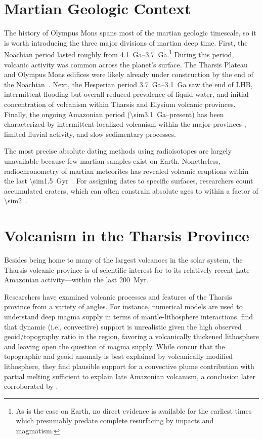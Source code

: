 \section{Martian Geologic Context}

The history of Olympus Mons spans most of the martian geologic timescale, so it is worth introducing the three major divisions of martian deep time\parencite{carr_geologic_2010}. First, the Noachian period lasted roughly from \qtyrange{4.1}{3.7}{Ga}.\footnote{As is the case on Earth, no direct evidence is available for the earliest times which presumably predate complete resurfacing by impacts and magmatism.} During this period, volcanic activity was common across the planet's surface. The Tharsis Plateau and Olympus Mons edifices were likely already under construction by the end of the Noachian~\parencite[cf.][]{isherwood_volcanic_2013,broquet_gravitational_2019}. Next, the Hesperian period \qtyrange{3.7}{3.1}{Ga} saw the end of \ac{LHB}, intermittent flooding but overall reduced prevalence of liquid water, and initial concentration of volcanism within Tharsis and Elysium volcanic provinces. Finally, the ongoing Amazonian period (\qty{\sim3.1}{Ga}--present) has been characterized by intermittent localized volcanism within the major provinces \parencite[e.g.,][]{grott_long-term_2013}, limited fluvial activity, and slow sedimentary processes.

The most precise absolute dating methods using radioisotopes are largely unavailable because few martian samples exist on Earth. Nonetheless, radiochronometry of martian meteorites has revealed volcanic eruptions within the last \qty{\sim1.5}{Gyr}~\parencite[e.g.,][]{cohen_taking_2017}. For assigning dates to specific surfaces, researchers count accumulated craters, which can often constrain absolute ages to within a factor of \num{\sim2}~\parencite[e.g.,][]{kneissl_map-projection-independent_2011}.

\section{Volcanism in the Tharsis Province}

Besides being home to many of the largest volcanoes in the solar system, the Tharsis volcanic province is of scientific interest for to its relatively recent Late Amazonian activity---within the last \qty{200}{Myr}.

Researchers have examined volcanic processes and features of the Tharsis province from a variety of angles. For instance, numerical models are used to understand deep magma supply in terms of mantle-lithosphere interactions. \textcite{roberts_plume-induced_2004} find that dynamic (i.e., convective) support is unrealistic given the high observed geoid/topography ratio in the region, favoring a volcanically thickened lithosphere and leaving open the question of magma supply. While \textcite{redmond_numerical_2004} concur that the topographic and geoid anomaly is best explained by volcanically modified lithosphere, they find plausible support for a convective plume contribution with partial melting sufficient to explain late Amazonian volcanism, a conclusion later corroborated by \textcite{plesa_thermal_2018}.

